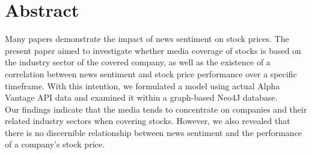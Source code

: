 \chapter{Abstract}
\label{cha:abstract}

Many papers demonstrate the impact of news sentiment on stock prices. The present paper aimed to investigate whether media coverage of stocks is based on the industry sector of the covered company, as well as the existence of a correlation between news sentiment and stock price performance over a specific timeframe. With this intention, we formulated a model using actual Alpha Vantage API data and examined it within a graph-based Neo4J database.\\
Our findings indicate that the media tends to concentrate on companies and their related industry sectors when covering stocks. However, we also revealed that there is no discernible relationship between news sentiment and the performance of a company's stock price.

